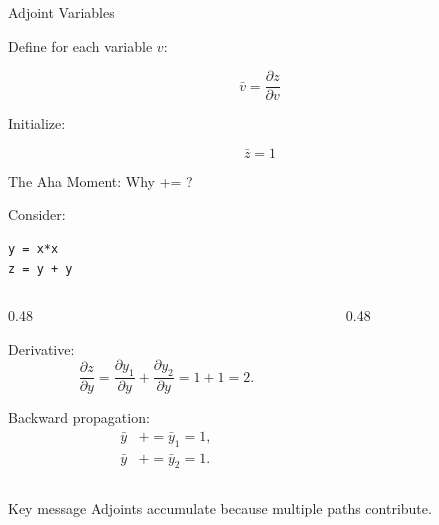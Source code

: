 \documentclass[12pt,xcolor={table}]{beamer}
\begin{document}
\begin{frame}{Adjoint Variables}

Define for each variable $v$:

\[
\bar{v} = \frac{\partial z}{\partial v}
\]

Initialize:

\[
\bar{z} = 1
\]

\end{frame}

\begin{frame}[fragile]{The Aha Moment: Why += ?}

        Consider:

\begin{lstlisting}
y = x*x
z = y + y
\end{lstlisting}

  \begin{columns}
    \begin{column}{0.48\linewidth}



Derivative:
\[
\frac{\partial z}{\partial y} = \frac{\partial y_1}{\partial y} + \frac{\partial y_2}{\partial y} = 1+1 = 2.
\]

Backward propagation:
\begin{align*}
\bar{y} &+= \bar{y}_1 = 1, \\
\bar{y} &+= \bar{y}_2 = 1.
\end{align*}


    \end{column}
    \begin{column}{0.48\linewidth}
      \begin{center}
\end{center}

    \end{column}
  \end{columns}
\begin{block}{Key message}
Adjoints accumulate because multiple paths contribute.
\end{block}

\end{frame}
\end{document}
